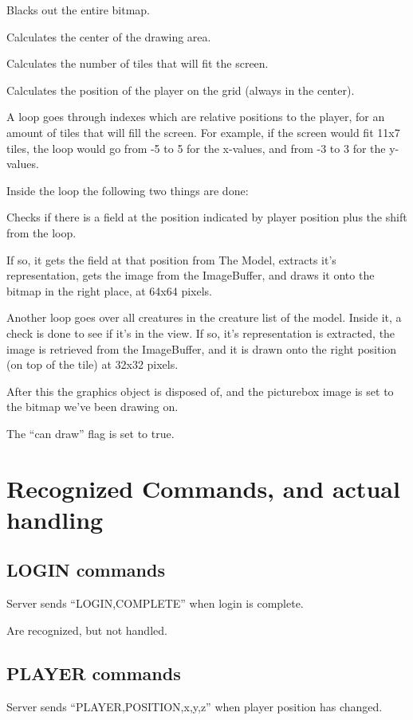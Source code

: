 \documentclass{article}
\begin{document}
				Blacks out the entire bitmap.
				
				Calculates the center of the drawing area.
				
				Calculates the number of tiles that will fit the screen.
				
				Calculates the position of the player on the grid (always in the center).
				
				A loop goes through indexes which are relative positions to the player, for an amount of tiles that will fill the screen. For example, if the screen would fit 11x7 tiles, the
				loop would go from -5 to 5 for the x-values, and from -3 to 3 for the y-values.
				
				Inside the loop the following two things are done:
				
				Checks if there is a field at the position indicated by player position plus the shift from the loop.
				
				If so, it gets the field at that position from The Model, extracts it's representation, gets the image from the ImageBuffer, and draws it onto the bitmap in the right place, at 64x64 pixels.
				
				Another loop goes over all creatures in the creature list of the model. Inside it, a check is done to see if it's in the view. If so, it's representation is extracted, the
				image is retrieved from the ImageBuffer, and it is drawn onto the right position (on top of the tile) at 32x32 pixels.
				
				After this the graphics object is disposed of, and the picturebox image is set to the bitmap we've been drawing on.
				
				The ``can draw'' flag is set to true.
	\section{Recognized Commands, and actual handling}
		\subsection{LOGIN commands}
			Server sends ``LOGIN,COMPLETE'' when login is complete.
			
			Are recognized, but not handled.
		\subsection{PLAYER commands}
			Server sends ``PLAYER,POSITION,x,y,z'' when player position has changed.
			
\end{document}
